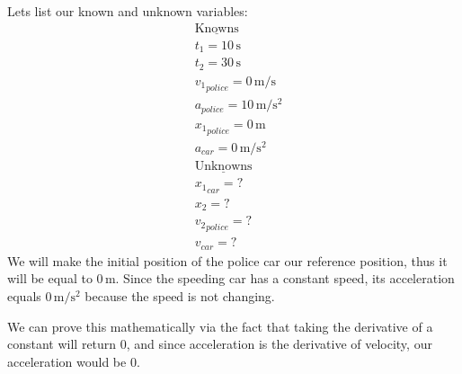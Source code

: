 \documentclass{article}
\begin{document}
	Lets list our known and unknown variables:
	\begin{align*}
		&\mathrm{\underline{Knowns}}\\
		&t_1 =10\,\mathrm{s} \\
		&t_2 = 30\,\mathrm{s} \\
		&{v_1}_{police} =0\,\mathrm{m/s} \\
		&a_{police} =10\,\mathrm{m/s^2}\\
		&{x_1}_{police} = 0\,\mathrm{m}\\
		&a_{car} =0\,\mathrm{m/s^2}\\
		&\mathrm{\underline{Unknowns}}\\
		&{x_1}_{car} = ?\\
		&x_2 = ?\\
		&{v_2}_{police} = ?\\
		&{v}_{car} = ?
	\end{align*}
	We will make the initial position of the police car our reference position, thus it will
	be equal to $0\,\mathrm{m}$. Since the speeding car has a constant speed, its acceleration
	equals $0\,\mathrm{m/s^2}$ because the speed is not changing. 

	We can prove this mathematically via the fact that taking the derivative of a constant will 
	return $0$, and since acceleration is the derivative of velocity, our acceleration would be $0$.
\end{document}
